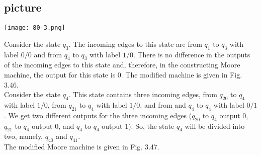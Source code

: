 \documentclass{article}
\begin{document}
\begin{center}
\section{picture}
\texttt{[image: 80-3.png]}
\end{center}

Consider the state $q_3$. The incoming edges to this state are from $q_1$ to $q_3$ with label $0/0$ and from $q_4$ to $q_3$
with label $1/0$. There is no difference in the outputs of the incoming edges to this state and, therefore,
in the constructing Moore machine, the output for this state is $0$. The modified machine is given in
Fig. 3.46.\\
\hspace*{0.3cm} Consider the state $q_4$. This state contains three incoming edges, from $q_20$ to $q_4$ with label $1/0$, from $q_21$ to
$q_4$ with label $1/0$, and from and $q_4$ to $q_4$ with label $0/1$. We get two different outputs for the three incoming
edges ($q_20$ to $q_4$ output $0$, $q_21$ to $q_4$ output $0$, and $q_4$ to $q_4$ output $1$). So, the state $q_4$ will be divided into two,
namely, $q_40$ and $q_41$.\\
\hspace*{0.3cm} The modified Moore machine is given in Fig. 3.47.
\end{document}
